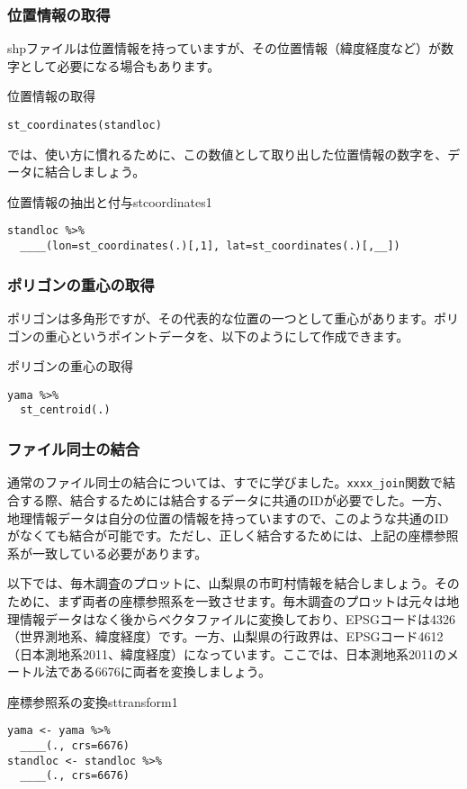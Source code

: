 \subsubsection{位置情報の取得}
shpファイルは位置情報を持っていますが、その位置情報（緯度経度など）が数字として必要になる場合もあります。
\begin{itembox}[l]{位置情報の取得}
\begin{verbatim}
st_coordinates(standloc)
\end{verbatim}
\end{itembox}

では、使い方に慣れるために、この数値として取り出した位置情報の数字を、データに結合しましょう。
\begin{exercise}{位置情報の抽出と付与}{stcoordinates1}
\begin{verbatim}
standloc %>%
  ____(lon=st_coordinates(.)[,1], lat=st_coordinates(.)[,__])
\end{verbatim}
\end{exercise}


\subsubsection{ポリゴンの重心の取得}
ポリゴンは多角形ですが、その代表的な位置の一つとして重心があります。ポリゴンの重心というポイントデータを、以下のようにして作成できます。
\begin{itembox}[l]{ポリゴンの重心の取得}
\begin{verbatim}
yama %>%
  st_centroid(.)
\end{verbatim}
\end{itembox}

\subsubsection{ファイル同士の結合}
通常のファイル同士の結合については、すでに学びました。\verb|xxxx_join|関数で結合する際、結合するためには結合するデータに共通のIDが必要でした。一方、地理情報データは自分の位置の情報を持っていますので、このような共通のIDがなくても結合が可能です。ただし、正しく結合するためには、上記の座標参照系が一致している必要があります。

以下では、毎木調査のプロットに、山梨県の市町村情報を結合しましょう。そのために、まず両者の座標参照系を一致させます。毎木調査のプロットは元々は地理情報データはなく後からベクタファイルに変換しており、EPSGコードは4326（世界測地系、緯度経度）です。一方、山梨県の行政界は、EPSGコード4612（日本測地系2011、緯度経度）になっています。ここでは、日本測地系2011のメートル法である6676に両者を変換しましょう。
\begin{exercise}{座標参照系の変換}{sttransform1}
\begin{verbatim}
yama <- yama %>%
  ____(., crs=6676)
standloc <- standloc %>%
  ____(., crs=6676)
\end{verbatim}
\end{exercise}

